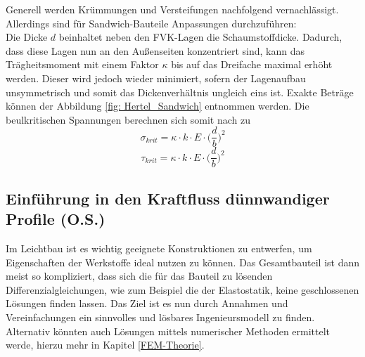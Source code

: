 \noindent Generell werden Krümmungen und Versteifungen nachfolgend vernachlässigt. Allerdings sind für Sandwich-Bauteile Anpassungen durchzuführen:\\
Die Dicke $d$ beinhaltet neben den FVK-Lagen die Schaumstoffdicke. Dadurch, dass diese Lagen nun an den Außenseiten konzentriert sind, kann das Trägheitsmoment mit einem Faktor $\kappa$ bis auf das Dreifache maximal erhöht werden. Dieser wird jedoch wieder minimiert, sofern der Lagenaufbau unsymmetrisch und somit das Dickenverhältnis ungleich eins ist. Exakte Beträge können der Abbildung \ref{fig: Hertel_Sandwich} entnommen werden. Die beulkritischen Spannungen berechnen sich somit nach \cite{item1} zu
\begin{equation}
	\sigma_{krit}=\kappa\cdot k\cdot E\cdot\Big(\frac{d}{b}\Big)^{2}
\end{equation}
\begin{equation}
	\tau_{krit}=\kappa\cdot k\cdot E\cdot\Big(\frac{d}{b}\Big)^{2}
\end{equation}
\newpage

\subsection{Einführung in den Kraftfluss dünnwandiger Profile (O.S.)}\label{Trägheitsmomente}
Im Leichtbau ist es wichtig geeignete Konstruktionen zu entwerfen, um Eigenschaften der Werkstoffe ideal nutzen zu können. Das Gesamtbauteil ist dann meist so kompliziert, dass sich die für das Bauteil zu lösenden Differenzialgleichungen, wie zum Beispiel die der Elastostatik, keine geschlossenen Lösungen finden lassen. Das Ziel ist es nun durch Annahmen und Vereinfachungen ein sinnvolles und lösbares Ingenieursmodell zu finden. Alternativ könnten auch Lösungen mittels numerischer Methoden ermittelt werde, hierzu mehr in Kapitel \ref{FEM-Theorie}.

